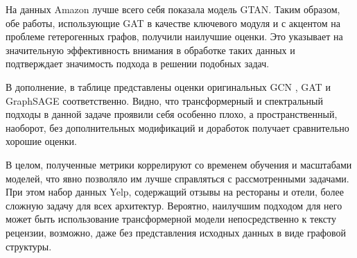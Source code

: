 На данных Amazon лучше всего себя показала модель GTAN. Таким образом, обе работы, использующие GAT \cite{velickovic2017} в качестве ключевого модуля и с акцентом на проблеме гетерогенных графов, получили наилучшие оценки. Это указывает на значительную эффективность внимания в обработке таких данных и подтверждает значимость подхода в решении подобных задач.

В дополнение, в таблице представлены оценки оригинальных GCN \cite{kipf2017}, GAT и GraphSAGE \cite{hamilton2017} соответственно. Видно, что трансформерный и спектральный подходы в данной задаче проявили себя особенно плохо, а пространственный, наоборот, без дополнительных модификаций и доработок получает сравнительно хорошие оценки.

В целом, полученные метрики коррелируют со временем обучения и масштабами моделей, что явно позволяло им лучше справляться с рассмотренными задачами. При этом набор данных Yelp, содержащий отзывы на рестораны и отели, более сложную задачу для всех архитектур. Вероятно, наилучшим подходом для него может быть использование трансформерной модели непосредственно к тексту рецензии, возможно, даже без представления исходных данных в виде графовой структуры.

\pagebreak
